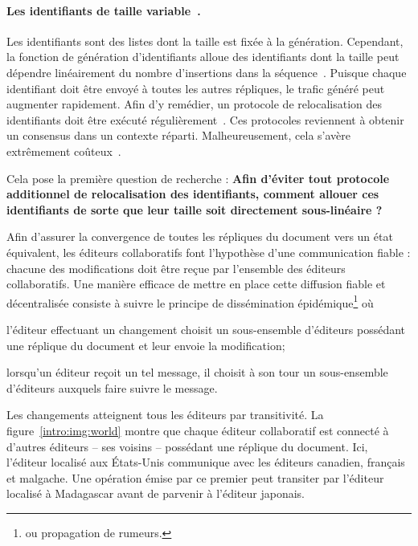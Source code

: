 \paragraph{Les identifiants de taille variable~\cite{weiss2009logoot}.} Les
identifiants sont des listes dont la taille est fixée à la
génération. Cependant, la fonction de génération d'identifiants alloue des
identifiants dont la taille peut dépendre linéairement du nombre d'insertions
dans la séquence~\cite{weiss2009logoot}.
Puisque chaque identifiant doit être envoyé à toutes les autres répliques, le
trafic généré peut augmenter rapidement.  Afin d'y remédier, un protocole de
relocalisation des identifiants doit être exécuté
régulièrement~\cite{zawirskiasynchronous}. Ces protocoles reviennent à obtenir
un consensus dans un contexte réparti. Malheureusement, cela s'avère extrêmement
coûteux~\cite{mostefaoui2015signature}.

Cela pose la première question de recherche : \textbf{Afin d'éviter tout
  protocole additionnel de relocalisation des identifiants, comment allouer ces
  identifiants de sorte que leur taille soit directement sous-linéaire ?}

Afin d'assurer la convergence de toutes les répliques du document vers un état
équivalent, les éditeurs collaboratifs font l'hypothèse d'une communication
fiable : chacune des modifications doit être reçue par l'ensemble des éditeurs
collaboratifs.
Une manière efficace de mettre en place cette diffusion fiable et décentralisée
consiste à suivre le principe de dissémination épidémique\footnote{ou propagation
  de rumeurs.}  où
\begin{inparaenum}[(i)]
\item l'éditeur effectuant un changement choisit un sous-ensemble d'éditeurs
  possédant une réplique du document et leur envoie la modification;
\item lorsqu'un éditeur reçoit un tel message, il choisit à son tour un
  sous-ensemble d'éditeurs auxquels faire suivre le message.
\end{inparaenum}
Les changements atteignent tous les éditeurs par transitivité.
La figure~\ref{intro:img:world} montre que chaque éditeur collaboratif est
connecté à d'autres éditeurs -- ses voisins -- possédant une réplique du
document. Ici, l'éditeur localisé aux États-Unis communique avec les éditeurs
canadien, français et malgache.
Une opération émise par ce premier peut transiter par l'éditeur localisé à
Madagascar avant de parvenir à l'éditeur japonais. 


